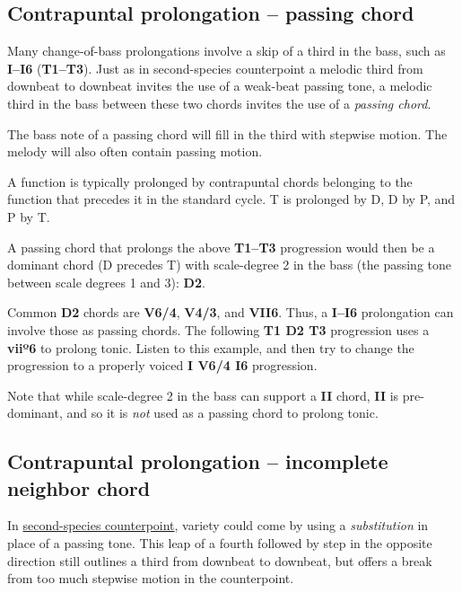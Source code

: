 \documentclass{book}
\begin{document}
\hypertarget{contrapuntal-prolongation-passing-chord}{%
\subsection{Contrapuntal prolongation -- passing
chord}\label{contrapuntal-prolongation-passing-chord}}

Many change-of-bass prolongations involve a skip of a third in the bass, such
as \textbf{I--I6} (\textbf{T1--T3}). Just as in second-species counterpoint a
melodic third from downbeat to downbeat invites the use of a weak-beat passing
tone, a melodic third in the bass between these two chords invites the use of
a \emph{passing chord}.

The bass note of a passing chord will fill in the third with stepwise motion.
The melody will also often contain passing motion.

A function is typically prolonged by contrapuntal chords belonging to the
function that precedes it in the standard cycle. T is prolonged by D, D by P,
and P by T.

A passing chord that prolongs the above \textbf{T1--T3} progression would then
be a dominant chord (D precedes T) with scale-degree 2 in the bass (the
passing tone between scale degrees 1 and 3): \textbf{D2}.

Common \textbf{D2} chords are \textbf{V6/4}, \textbf{V4/3}, and \textbf{VII6}.
Thus, a \textbf{I--I6} prolongation can involve those as passing chords. The
following \textbf{T1 D2 T3} progression uses a \textbf{viiº6} to prolong
tonic. Listen to this example, and then try to change the progression to a
properly voiced \textbf{I V6/4 I6} progression.

Note that while scale-degree 2 in the bass can support a \textbf{II} chord,
\textbf{II} is pre-dominant, and so it is \emph{not} used as a passing chord
to prolong tonic.

\hypertarget{contrapuntal-prolongation-incomplete-neighbor-chord}{%
\subsection{Contrapuntal prolongation -- incomplete neighbor
chord}\label{contrapuntal-prolongation-incomplete-neighbor-chord}}

In \href{secondSpecies.html}{second-species counterpoint}, variety could come
by using a \emph{substitution} in place of a passing tone. This leap of a
fourth followed by step in the opposite direction still outlines a third from
downbeat to downbeat, but offers a break from too much stepwise motion in the
counterpoint.
\end{document}
